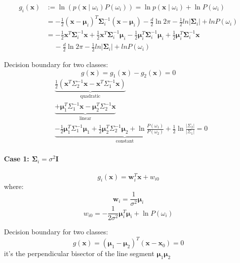 \documentclass{article}
\begin{document}
\begin{multicols}{2}
\[\begin{split}
	g_i(\symbf{x}) &:= \ln (p(\symbf{x} \mid \omega_i) P(\omega_i)) = \ln p(\symbf{x} \mid \omega_i) + \ln P(\omega_i) \\
	&= -\frac{1}{2} (\symbf{x} - \symbf{\mu}_i)^T \symbf{\Sigma}_i^{-1} (\symbf{x} - \symbf{\mu}_i) - \frac{d}{2}\ln2\pi - \frac{1}{2} ln |\symbf{\Sigma}_i| + ln P(\omega_i) \\
	&= - \frac{1}{2} \symbf{x}^T \symbf{\Sigma}_i^{-1} \symbf{x} + \frac{1}{2} \symbf{x}^T \symbf{\Sigma}_i^{-1} \symbf{\mu}_i - \frac{1}{2} \symbf{\mu}_i^T \symbf{\Sigma}_i^{-1} \symbf{\mu}_i + \frac{1}{2} \symbf{\mu}_i^T \symbf{\Sigma}_i^{-1} \symbf{x} \\
	&\quad\, - \frac{d}{2}\ln2\pi - \frac{1}{2} ln |\symbf{\Sigma}_i| + ln P(\omega_i)
\end{split}\]

Decision boundary for two classes:
\[g(\symbf{x}) = g_1(\symbf{x}) - g_2(\symbf{x}) = 0\]
\[\begin{split}
	&\underbrace{\frac{1}{2} \left( \symbf{x}^T \Sigma_2^{-1} \symbf{x} - \symbf{x}^T \Sigma_1^{-1} \symbf{x} \right)}_{\text{quadratic}} \\
	&\underbrace{+ \symbf{\mu}_1^T \Sigma_1^{-1} \symbf{x} - \symbf{\mu}_2^T \Sigma_2^{-1} \symbf{x}}_{\text{linear}} \\
	&\underbrace{- \frac{1}{2} \symbf{\mu}_1^T \Sigma_1^{-1} \symbf{\mu}_1 + \frac{1}{2} \symbf{\mu}_2^T \Sigma_2^{-1} \symbf{\mu}_2 + \ln \frac{P(\omega_1)}{P(\omega_2)} + \frac{1}{2} \ln \frac{|\Sigma_2|}{|\Sigma_1|}}_{\text{constant}} = 0
\end{split}\]

\paragraph{Case 1: $\symbf{\Sigma}_i = \sigma^2 \symbf{I}$}
\[g_i(\symbf{x}) = \symbf{w}_i^T \symbf{x} + w_{i0}\]
where:
\[\symbf{w}_i = \frac{1}{\sigma^{2}} \symbf{\mu}_i\]
\[w_{i0} = -\frac{1}{2\sigma^2}\symbf{\mu}_i^T \symbf{\mu}_i + \ln P(\omega_i) \]

Decision boundary for two classes:
\[g(\symbf{x}) = (\symbf{\mu}_1 - \symbf{\mu}_2)^T (\symbf{x} - \symbf{x}_0) = 0\]
it's the perpendicular bisector of the line segment $\symbf{\mu}_1 \symbf{\mu}_2$


\end{multicols}
\end{document}
